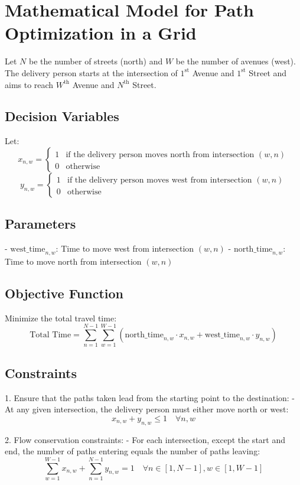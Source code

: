 \documentclass{article}
\begin{document}
\section*{Mathematical Model for Path Optimization in a Grid}

Let \( N \) be the number of streets (north) and \( W \) be the number of avenues (west). The delivery person starts at the intersection of \( 1^{\text{st}} \) Avenue and \( 1^{\text{st}} \) Street and aims to reach \( W^{\text{th}} \) Avenue and \( N^{\text{th}} \) Street.

\subsection*{Decision Variables}
Let:
\[
x_{n,w} = 
\begin{cases} 
1 & \text{if the delivery person moves north from intersection } (w, n) \\
0 & \text{otherwise}
\end{cases}
\]
\[
y_{n,w} = 
\begin{cases} 
1 & \text{if the delivery person moves west from intersection } (w, n) \\
0 & \text{otherwise}
\end{cases}
\]

\subsection*{Parameters}
- \( \text{west\_time}_{n,w} \): Time to move west from intersection \( (w, n) \)
- \( \text{north\_time}_{n,w} \): Time to move north from intersection \( (w, n) \)

\subsection*{Objective Function}
Minimize the total travel time:
\[
\text{Total Time} = \sum_{n=1}^{N-1} \sum_{w=1}^{W-1} \left( \text{north\_time}_{n,w} \cdot x_{n,w} + \text{west\_time}_{n,w} \cdot y_{n,w} \right)
\]

\subsection*{Constraints}
1. Ensure that the paths taken lead from the starting point to the destination:
   - At any given intersection, the delivery person must either move north or west:
   \[
   x_{n,w} + y_{n,w} \leq 1 \quad \forall n, w
   \]

2. Flow conservation constraints:
   - For each intersection, except the start and end, the number of paths entering equals the number of paths leaving:
   \[
   \sum_{w=1}^{W-1} x_{n,w} + \sum_{n=1}^{N-1} y_{n,w} = 1 \quad \forall n \in [1, N-1], w \in [1, W-1]
   \]
\end{document}
